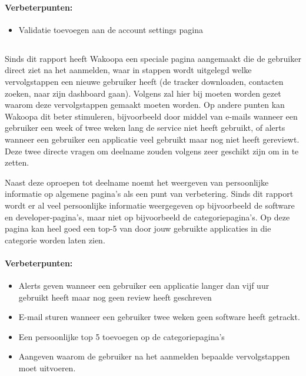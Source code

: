 \documentclass[a4paper, 10pt, pdftex]{report}
\begin{document}
      \paragraph{\textbf{Verbeterpunten:}}
      \begin{itemize}
        \item Validatie toevoegen aan de account settings pagina
      \end{itemize}

    \subsection{\cite{Alfrink2008}}
    Sinds dit rapport heeft Wakoopa een speciale pagina aangemaakt die de gebruiker direct ziet na het aanmelden, waar in stappen wordt uitgelegd welke vervolgstappen een nieuwe gebruiker heeft (de tracker downloaden, contacten zoeken, naar zijn dashboard gaan). Volgens \citeauthor{Brouns2008} zal hier bij moeten worden gezet waarom deze vervolgstappen gemaakt moeten worden. Op andere punten kan Wakoopa dit beter stimuleren, bijvoorbeeld door middel van e-mails wanneer een gebruiker een week of twee weken lang de service niet heeft gebruikt, of alerts wanneer een gebruiker een applicatie veel gebruikt maar nog niet heeft gereviewt. Deze twee directe vragen om deelname zouden volgens \citeauthor{Alfrink2008} zeer geschikt zijn om in te zetten.

    Naast deze oproepen tot deelname noemt \citeauthor{Alfrink2008} het weergeven van persoonlijke informatie op algemene pagina's als een punt van verbetering. Sinds dit rapport wordt er al veel persoonlijke informatie weergegeven op bijvoorbeeld de software en developer-pagina's, maar niet op bijvoorbeeld de categoriepagina's. Op deze pagina kan heel goed een top-5 van door jouw gebruikte applicaties in die categorie worden laten zien.
    \paragraph{\textbf{Verbeterpunten:}}
      \begin{itemize}
        \item Alerts geven wanneer een gebruiker een applicatie langer dan vijf uur gebruikt heeft maar nog geen review heeft geschreven
        \item E-mail sturen wanneer een gebruiker twee weken geen software heeft getrackt.
        \item Een persoonlijke top 5 toevoegen op de categoriepagina's
        \item Aangeven waarom de gebruiker na het aanmelden bepaalde vervolgstappen moet uitvoeren.
      \end{itemize}
\end{document}
